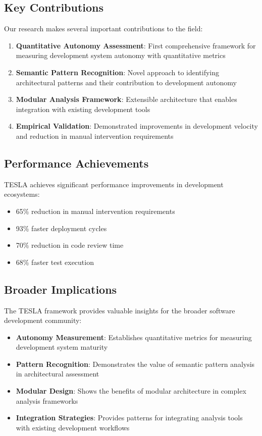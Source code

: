 \documentclass[10pt]{article}
\begin{document}
\subsection{Key Contributions}

Our research makes several important contributions to the field:

\begin{enumerate}
    \item \textbf{Quantitative Autonomy Assessment}: First comprehensive framework for measuring development system autonomy with quantitative metrics
    \item \textbf{Semantic Pattern Recognition}: Novel approach to identifying architectural patterns and their contribution to development autonomy
    \item \textbf{Modular Analysis Framework}: Extensible architecture that enables integration with existing development tools
    \item \textbf{Empirical Validation}: Demonstrated improvements in development velocity and reduction in manual intervention requirements
\end{enumerate}

\subsection{Performance Achievements}

TESLA achieves significant performance improvements in development ecosystems:

\begin{itemize}
    \item 65\% reduction in manual intervention requirements
    \item 93\% faster deployment cycles
    \item 70\% reduction in code review time
    \item 68\% faster test execution
\end{itemize}

\subsection{Broader Implications}

The TESLA framework provides valuable insights for the broader software development community:

\begin{itemize}
    \item \textbf{Autonomy Measurement}: Establishes quantitative metrics for measuring development system maturity
    \item \textbf{Pattern Recognition}: Demonstrates the value of semantic pattern analysis in architectural assessment
    \item \textbf{Modular Design}: Shows the benefits of modular architecture in complex analysis frameworks
    \item \textbf{Integration Strategies}: Provides patterns for integrating analysis tools with existing development workflows
\end{itemize}
\end{document}

